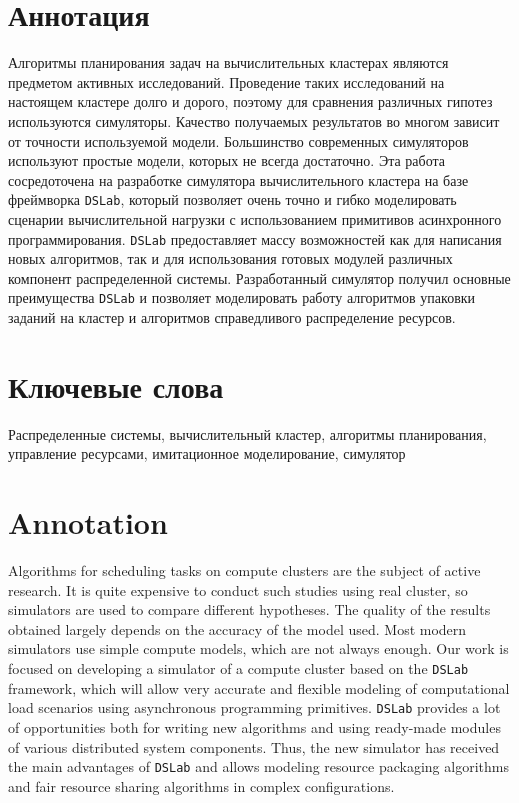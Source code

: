 
{

\section*{Аннотация}

Алгоритмы планирования задач на вычислительных кластерах являются предметом активных исследований. Проведение таких исследований на настоящем кластере долго и дорого, поэтому для сравнения различных гипотез используются симуляторы. Качество получаемых результатов во многом зависит от точности используемой модели. Большинство современных симуляторов используют простые модели, которых не всегда достаточно. Эта работа сосредоточена на разработке симулятора вычислительного кластера на базе фреймворка \texttt{DSLab}, который позволяет очень точно и гибко моделировать сценарии вычислительной нагрузки с использованием примитивов асинхронного программирования. \texttt{DSLab} предоставляет массу возможностей как для написания новых алгоритмов, так и для использования готовых модулей различных компонент распределенной системы. Разработанный симулятор получил основные преимущества \texttt{DSLab} и позволяет моделировать работу алгоритмов упаковки заданий на кластер и алгоритмов справедливого распределение ресурсов.

\section*{Ключевые слова}

Распределенные системы, вычислительный кластер, алгоритмы планирования, управление ресурсами, имитационное моделирование, симулятор

\section*{Annotation}
Algorithms for scheduling tasks on compute clusters are the subject of active research. It is quite expensive to conduct such studies using real cluster, so simulators are used to compare different hypotheses. The quality of the results obtained largely depends on the accuracy of the model used. Most modern simulators use simple compute models, which are not always enough. Our work is focused on developing a simulator of a compute cluster based on the \texttt{DSLab} framework, which will allow very accurate and flexible modeling of computational load scenarios using asynchronous programming primitives. \texttt{DSLab} provides a lot of opportunities both for writing new algorithms and using ready-made modules of various distributed system components. Thus, the new simulator has received the main advantages of \texttt{DSLab} and allows modeling resource packaging algorithms and fair resource sharing algorithms in complex configurations.


}
